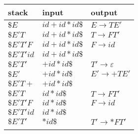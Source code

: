 \documentclass{standalone}
\providecommand\lightrule{%
	\arrayrulecolor{black!30}%
	\midrule[\lightrulewidth]%
	\arrayrulecolor{black}}
\begin{document}
\begin{tabularx}{\textwidth}{XXX}
    stack & input & output \\
    \midrule
        \(\$E\)
        &
        \(id + id * id\$\)
        &
        \(E \to TE'\)

        \\ \lightrule

        \(\$E'T\)
        &
        \(id + id * id\$\)
        &
        \(T \to FT'\)

        \\ \lightrule

        \(\$E'T'F\)
        &
        \(id + id * id\$\)
        &
        \(F \to id\)

        \\ \lightrule

        \(\$E'T'id\)
        &
        \(id + id * id\$\)
        &

        \\ \lightrule

        \(\$E'T'\)
        &
        \(+ id * id\$\)
        &
        \(T' \to \varepsilon\)

        \\ \lightrule

        \(\$E'\)
        &
        \(+ id * id\$\)
        &
        \(E' \to +TE'\)

        \\ \lightrule

        \(\$E'T+\)
        &
        \(+ id * id\$\)
        &

        \\ \lightrule

        \(\$E'T\)
        &
        \(id * id\$\)
        &
        \(T \to FT'\)

        \\ \lightrule

        \(\$E'T'F\)
        &
        \(id * id\$\)
        &
        \(F \to id\)

        \\ \lightrule

        \(\$E'T'id\)
        &
        \(id * id\$\)
        &

        \\ \lightrule

        \(\$E'T'\)
        &
        \(* id\$\)
        &
        \(T' \to \ast FT'\)

        \\ \lightrule


\end{tabularx}
\end{document}
